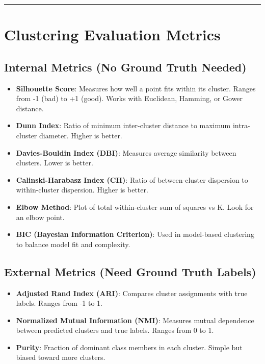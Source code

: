 \documentclass[
  letterpaper,
  DIV=11,
  numbers=noendperiod]{scrartcl}
\providecommand{\tightlist}{%
  \setlength{\itemsep}{0pt}\setlength{\parskip}{0pt}}\usepackage{longtable,booktabs,array}
\begin{document}
\begin{center}\rule{0.5\linewidth}{0.5pt}\end{center}

\section{Clustering Evaluation
Metrics}\label{clustering-evaluation-metrics}

\subsection{Internal Metrics (No Ground Truth
Needed)}\label{internal-metrics-no-ground-truth-needed}

\begin{itemize}
\tightlist
\item
  \textbf{Silhouette Score}: Measures how well a point fits within its
  cluster. Ranges from -1 (bad) to +1 (good). Works with Euclidean,
  Hamming, or Gower distance.
\item
  \textbf{Dunn Index}: Ratio of minimum inter-cluster distance to
  maximum intra-cluster diameter. Higher is better.
\item
  \textbf{Davies-Bouldin Index (DBI)}: Measures average similarity
  between clusters. Lower is better.
\item
  \textbf{Calinski-Harabasz Index (CH)}: Ratio of between-cluster
  dispersion to within-cluster dispersion. Higher is better.
\item
  \textbf{Elbow Method}: Plot of total within-cluster sum of squares vs
  K. Look for an elbow point.
\item
  \textbf{BIC (Bayesian Information Criterion)}: Used in model-based
  clustering to balance model fit and complexity.
\end{itemize}

\subsection{External Metrics (Need Ground Truth
Labels)}\label{external-metrics-need-ground-truth-labels}

\begin{itemize}
\tightlist
\item
  \textbf{Adjusted Rand Index (ARI)}: Compares cluster assignments with
  true labels. Ranges from -1 to 1.
\item
  \textbf{Normalized Mutual Information (NMI)}: Measures mutual
  dependence between predicted clusters and true labels. Ranges from 0
  to 1.
\item
  \textbf{Purity}: Fraction of dominant class members in each cluster.
  Simple but biased toward more clusters.
\end{itemize}
\end{document}

